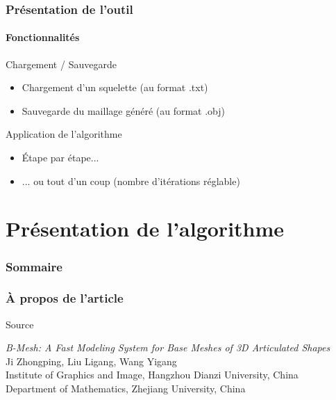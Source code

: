 \documentclass[9pt]{beamer}
\begin{document}
\begin{frame}
	\frametitle{Présentation de l'outil}
	\framesubtitle{Fonctionnalités}
	\begin{block}{Chargement / Sauvegarde}
		\begin{itemize}
			\item Chargement d'un squelette (au format .txt)
			\item Sauvegarde du maillage généré (au format .obj)
		\end{itemize}				
	\end{block}
	\begin{block}{Application de l'algorithme}
		\begin{itemize}
			\item Étape par étape...
			\item ... ou tout d'un coup (nombre d'itérations réglable)
		\end{itemize}
	\end{block}
\end{frame}



\section{Présentation de l'algorithme}

\begin{frame}
	\frametitle{Sommaire}
	\tableofcontents[currentsection]
\end{frame}

\begin{frame}
	\frametitle{À propos de l'article}
	\begin{block}{Source}
		\begin{center}
			\textit{B-Mesh: A Fast Modeling System for Base Meshes of 3D Articulated Shapes} \\
			Ji Zhongping, Liu Ligang, Wang Yigang \\ 
			
			Institute of Graphics and Image, Hangzhou Dianzi University, China \\
			Department of Mathematics, Zhejiang University, China
		\end{center}
	\end{block}
\end{frame}
\end{document}
